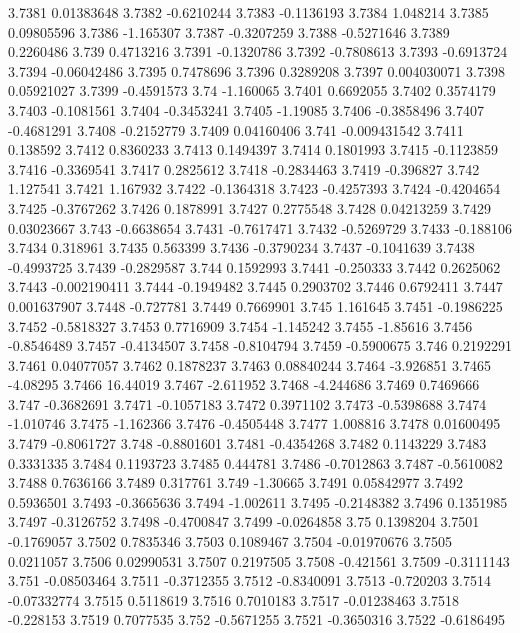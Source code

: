 3.7381  0.01383648
3.7382  -0.6210244
3.7383  -0.1136193
3.7384  1.048214
3.7385  0.09805596
3.7386  -1.165307
3.7387  -0.3207259
3.7388  -0.5271646
3.7389  0.2260486
3.739  0.4713216
3.7391  -0.1320786
3.7392  -0.7808613
3.7393  -0.6913724
3.7394  -0.06042486
3.7395  0.7478696
3.7396  0.3289208
3.7397  0.004030071
3.7398  0.05921027
3.7399  -0.4591573
3.74  -1.160065
3.7401  0.6692055
3.7402  0.3574179
3.7403  -0.1081561
3.7404  -0.3453241
3.7405  -1.19085
3.7406  -0.3858496
3.7407  -0.4681291
3.7408  -0.2152779
3.7409  0.04160406
3.741  -0.009431542
3.7411  0.138592
3.7412  0.8360233
3.7413  0.1494397
3.7414  0.1801993
3.7415  -0.1123859
3.7416  -0.3369541
3.7417  0.2825612
3.7418  -0.2834463
3.7419  -0.396827
3.742  1.127541
3.7421  1.167932
3.7422  -0.1364318
3.7423  -0.4257393
3.7424  -0.4204654
3.7425  -0.3767262
3.7426  0.1878991
3.7427  0.2775548
3.7428  0.04213259
3.7429  0.03023667
3.743  -0.6638654
3.7431  -0.7617471
3.7432  -0.5269729
3.7433  -0.188106
3.7434  0.318961
3.7435  0.563399
3.7436  -0.3790234
3.7437  -0.1041639
3.7438  -0.4993725
3.7439  -0.2829587
3.744  0.1592993
3.7441  -0.250333
3.7442  0.2625062
3.7443  -0.002190411
3.7444  -0.1949482
3.7445  0.2903702
3.7446  0.6792411
3.7447  0.001637907
3.7448  -0.727781
3.7449  0.7669901
3.745  1.161645
3.7451  -0.1986225
3.7452  -0.5818327
3.7453  0.7716909
3.7454  -1.145242
3.7455  -1.85616
3.7456  -0.8546489
3.7457  -0.4134507
3.7458  -0.8104794
3.7459  -0.5900675
3.746  0.2192291
3.7461  0.04077057
3.7462  0.1878237
3.7463  0.08840244
3.7464  -3.926851
3.7465  -4.08295
3.7466  16.44019
3.7467  -2.611952
3.7468  -4.244686
3.7469  0.7469666
3.747  -0.3682691
3.7471  -0.1057183
3.7472  0.3971102
3.7473  -0.5398688
3.7474  -1.010746
3.7475  -1.162366
3.7476  -0.4505448
3.7477  1.008816
3.7478  0.01600495
3.7479  -0.8061727
3.748  -0.8801601
3.7481  -0.4354268
3.7482  0.1143229
3.7483  0.3331335
3.7484  0.1193723
3.7485  0.444781
3.7486  -0.7012863
3.7487  -0.5610082
3.7488  0.7636166
3.7489  0.317761
3.749  -1.30665
3.7491  0.05842977
3.7492  0.5936501
3.7493  -0.3665636
3.7494  -1.002611
3.7495  -0.2148382
3.7496  0.1351985
3.7497  -0.3126752
3.7498  -0.4700847
3.7499  -0.0264858
3.75  0.1398204
3.7501  -0.1769057
3.7502  0.7835346
3.7503  0.1089467
3.7504  -0.01970676
3.7505  0.0211057
3.7506  0.02990531
3.7507  0.2197505
3.7508  -0.421561
3.7509  -0.3111143
3.751  -0.08503464
3.7511  -0.3712355
3.7512  -0.8340091
3.7513  -0.720203
3.7514  -0.07332774
3.7515  0.5118619
3.7516  0.7010183
3.7517  -0.01238463
3.7518  -0.228153
3.7519  0.7077535
3.752  -0.5671255
3.7521  -0.3650316
3.7522  -0.6186495
